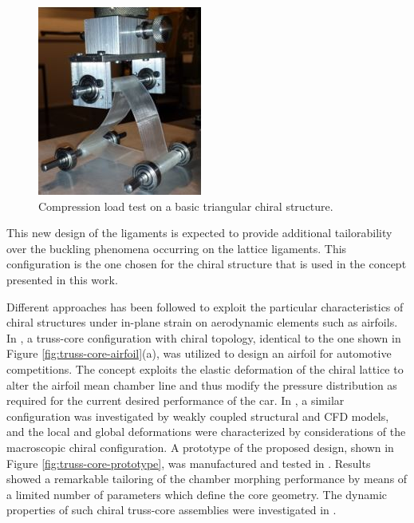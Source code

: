   \begin{figure}[!htpb]
    \centering
    \includegraphics[width=0.5 \textwidth]{figures/state-of-the-art/basic-triangular-test}
    \caption[Compression load test on a basic triangular chiral structure]{Compression load test on a basic triangular chiral structure. \cite{Ramstein2016}}\label{fig:basic-triangular-test}
  \end{figure}

  This new design of the ligaments is expected to provide additional tailorability over the buckling phenomena occurring on the lattice ligaments. This configuration is the one chosen for the chiral structure that is used in the concept presented in this work.

  Different approaches has been followed to exploit the particular characteristics of chiral structures under in-plane strain on aerodynamic elements such as airfoils. In \cite{Bornengo2005}, a truss-core configuration with chiral topology, identical to the one shown in Figure \ref{fig:truss-core-airfoil}(a), was utilized to design an airfoil for automotive competitions. The concept exploits the elastic deformation of the chiral lattice to alter the airfoil mean chamber line and thus modify the pressure distribution as required for the current desired performance of the car. In \cite{Spadoni2007a}, a similar configuration was investigated by weakly coupled structural and CFD models, and the local and global deformations were characterized by considerations of the macroscopic chiral configuration. A prototype of the proposed design, shown in Figure \ref{fig:truss-core-prototype}, was manufactured and tested in \cite{Spadoni2007b}. Results showed a remarkable tailoring of the chamber morphing performance by means of a limited number of parameters which define the core geometry. The dynamic properties of such chiral truss-core assemblies were investigated in \cite{Spadoni2006}.

